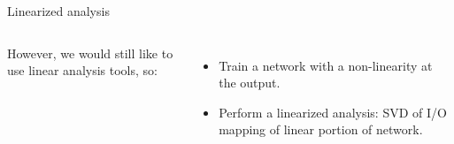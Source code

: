 \documentclass{beamer}
\begin{document}
\begin{frame}{Linearized analysis}
\begin{columns}
	However, we would still like to use linear analysis tools, so:
	\begin{itemize}
	    \item<2-> Train a network with a non-linearity at the output.
	    \item<3-> Perform a linearized analysis: SVD of I/O mapping of linear portion of network. 
	\end{itemize}
\end{columns}

\end{frame}
\end{document}
